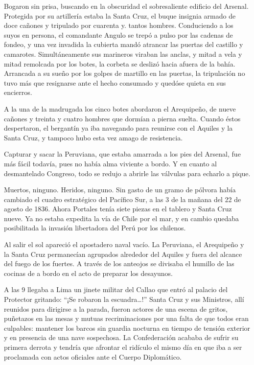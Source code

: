 \documentclass[10pt,twoside,openright]{memoir}
\begin{document}
Bogaron sin prisa, buscando en la obscuridad el sobresaliente edificio
del Arsenal. Protegida por su artillería estaba la Santa Cruz, el buque
insignia armado de doce cañones y tripulado por cuarenta y. tantos
hombres. Conduciendo a los suyos en persona, el comandante Angulo se
trepó a pulso por las cadenas de fondeo, y una vez invadida la cubierta
mandó atrancar las puertas del castillo y camarotes. Simultáneamente sus
marineros viraban las anclas, y mitad a vela y mitad remolcada por los
botes, la corbeta se deslizó hacia afuera de la bahía. Arrancada a su
sueño por los golpes de martillo en las puertas, la tripulación no tuvo
más que resignarse ante el hecho consumado y quedóse quieta en sus
encierros.

A la una de la madrugada los cinco botes abordaron el Arequipeño, de
nueve cañones y treinta y cuatro hombres que dormían a pierna suelta.
Cuando éstos despertaron, el bergantín ya iba navegando para reunirse
con el Aquiles y la Santa Cruz, y tampoco hubo esta vez amago de
resistencia.

Capturar y sacar la Peruviana, que estaba amarrada a los pies del
Arsenal, fue más fácil todavía, pues no había alma viviente a bordo. Y
en cuanto al desmantelado Congreso, todo se redujo a abrirle las
válvulas para echarlo a pique.

Muertos, ninguno. Heridos, ninguno. Sin gasto de un gramo de pólvora
había cambiado el cuadro estratégico del Pacífico Sur, a las 3 de la
mañana del 22 de agosto de 1836. Ahora Portales tenía siete piezas en el
tablero y Santa Cruz nueve. Ya no estaba expedita la vía de Chile por el
mar, y en cambio quedaba posibilitada la invasión libertadora del Perú
por los chilenos.

Al salir el sol apareció el apostadero naval vacío. La Peruviana, el
Arequipeño y la Santa Cruz permanecían agrupados alrededor del Aquiles y
fuera del alcance del fuego de los fuertes. A través de los anteojos se
divisaba el humillo de las cocinas de a bordo en el acto de preparar los
desayunos.

A las 9 llegaba a Lima un jinete militar del Callao que entró al palacio
del Protector gritando: ``¡Se robaron la escuadra\ldots!'' Santa Cruz y sus
Ministros, allí reunidos para dirigirse a la parada, fueron actores de
una escena de gritos, puñetazos en las mesas y mutuas recriminaciones
por una falta de que todos eran culpables: mantener los barcos sin
guardia nocturna en tiempo de tensión exterior y en presencia de una
nave sospechosa. La Confederación acababa de sufrir su primera derrota y
tendría que afrontar el ridículo el mismo día en que iba a ser
proclamada con actos oficiales ante el Cuerpo Diplomático.
\end{document}
